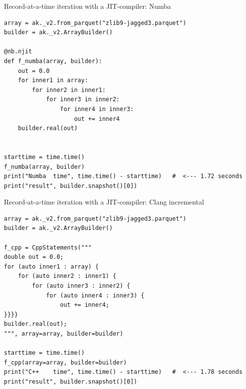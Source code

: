 \documentclass[aspectratio=169]{beamer}
\begin{document}
\begin{frame}[fragile]{Record-at-a-time iteration with a JIT-compiler: Numba}
\vspace{0.1 cm}
\small
\begin{verbatim}
array = ak._v2.from_parquet("zlib9-jagged3.parquet")
builder = ak._v2.ArrayBuilder()

@nb.njit
def f_numba(array, builder):
    out = 0.0
    for inner1 in array:
        for inner2 in inner1:
            for inner3 in inner2:
                for inner4 in inner3:
                    out += inner4
    builder.real(out)


starttime = time.time()
f_numba(array, builder)
print("Numba  time", time.time() - starttime)   #  <--- 1.72 seconds
print("result", builder.snapshot()[0])
\end{verbatim}
\end{frame}

\begin{frame}[fragile]{Record-at-a-time iteration with a JIT-compiler: Clang incremental}
\vspace{0.1 cm}
\small
\begin{verbatim}
array = ak._v2.from_parquet("zlib9-jagged3.parquet")
builder = ak._v2.ArrayBuilder()

f_cpp = CppStatements("""
double out = 0.0;
for (auto inner1 : array) {
    for (auto inner2 : inner1) {
        for (auto inner3 : inner2) {
            for (auto inner4 : inner3) {
                out += inner4;
}}}}
builder.real(out);
""", array=array, builder=builder)

starttime = time.time()
f_cpp(array=array, builder=builder)
print("C++    time", time.time() - starttime)   #  <--- 1.78 seconds
print("result", builder.snapshot()[0])
\end{verbatim}
\end{frame}
\end{document}
